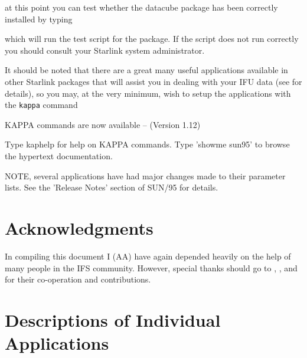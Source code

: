 \documentclass[twoside,11pt,nolof]{starlink}
\begin{document}
at this point you can test whether the datacube package has been
correctly installed by typing

\begin{small}
\begin{terminalv}
\end{terminalv}
\end{small}

which will run the test script for the package. If the script does not
run correctly you should consult your Starlink system administrator.

It should be noted that there are a great many useful applications
available in other Starlink packages that will assist you in dealing
with your IFU data (see  for details), so you may,
at the very minimum, wish to setup the 
applications with the \texttt{kappa} command

\begin{small}
\begin{terminalv}

    KAPPA commands are now available -- (Version 1.12)

    Type kaphelp for help on KAPPA commands.
    Type 'showme sun95' to browse the hypertext documentation.

    NOTE, several applications have had major changes made to their
    parameter lists. See the 'Release Notes' section of SUN/95 for
    details.
%
\end{terminalv}
\end{small}

\section*{Acknowledgments\label{sun237_acks}}

In compiling this document I (AA) have again depended heavily on the help
of many people in the IFS community. However, special thanks should go
to , ,
 and
 for their
co-operation and contributions.

\newpage
\appendix
\section{Descriptions of Individual Applications}
\label{sun237_appendix_descriptions}
\end{document}
